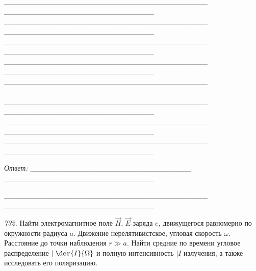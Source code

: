 \begin{enumerate}
    \_\_\_\_\_\_\_\_\_\_\_\_\_\_\_\_\_\_\_\_\_\_\_\_\_\_\_\_\_\_\_\_\_\_\_\_\_\_
    \!\!\_\_\_\_\_\_\_\_\_\_\_\_\_\_\_\_\_\_\_\_\_\_\_\_\_\_\_\_\\
    \_\_\_\_\_\_\_\_\_\_\_\_\_\_\_\_\_\_\_\_\_\_\_\_\_\_\_\_\_\_\_\_\_\_\_\_\_\_
    \!\!\_\_\_\_\_\_\_\_\_\_\_\_\_\_\_\_\_\_\_\_\_\_\_\_\_\_\_\_\\
    \_\_\_\_\_\_\_\_\_\_\_\_\_\_\_\_\_\_\_\_\_\_\_\_\_\_\_\_\_\_\_\_\_\_\_\_\_\_
    \!\!\_\_\_\_\_\_\_\_\_\_\_\_\_\_\_\_\_\_\_\_\_\_\_\_\_\_\_\_\\
    \_\_\_\_\_\_\_\_\_\_\_\_\_\_\_\_\_\_\_\_\_\_\_\_\_\_\_\_\_\_\_\_\_\_\_\_\_\_
    \!\!\_\_\_\_\_\_\_\_\_\_\_\_\_\_\_\_\_\_\_\_\_\_\_\_\_\_\_\_\\
    \_\_\_\_\_\_\_\_\_\_\_\_\_\_\_\_\_\_\_\_\_\_\_\_\_\_\_\_\_\_\_\_\_\_\_\_\_\_
    \!\!\_\_\_\_\_\_\_\_\_\_\_\_\_\_\_\_\_\_\_\_\_\_\_\_\_\_\_\_\\
    \_\_\_\_\_\_\_\_\_\_\_\_\_\_\_\_\_\_\_\_\_\_\_\_\_\_\_\_\_\_\_\_\_\_\_\_\_\_
    \!\!\_\_\_\_\_\_\_\_\_\_\_\_\_\_\_\_\_\_\_\_\_\_\_\_\_\_\_\_\\
    \_\_\_\_\_\_\_\_\_\_\_\_\_\_\_\_\_\_\_\_\_\_\_\_\_\_\_\_\_\_\_\_\_\_\_\_\_\_
    \!\!\_\_\_\_\_\_\_\_\_\_\_\_\_\_\_\_\_\_\_\_\_\_\_\_\_\_\_\_\\
    \_\_\_\_\_\_\_\_\_\_\_\_\_\_\_\_\_\_\_\_\_\_\_\_\_\_\_\_\_\_\_\_\_\_\_\_\_\_
    \!\!\_\_\_\_\_\_\_\_\_\_\_\_\_\_\_\_\_\_\_\_\_\_\_\_\_\_\_\_\\
\end{enumerate}

\vspace*{2em}
\emph{Ответ:}
    \_\_\_\_\_\_\_\_\_\_\_\_\_\_\_\_\_\_\_\_\_\_\_\_\_\_\_\_\_\_
    \!\!\_\_\_\_\_\_\_\_\_\_\_\_\_\_\_\_\_\_\_\_\_\_\_\_\_\_\_\_
      
    \_\_\_\_\_\_\_\_\_\_\_\_\_\_\_\_\_\_\_\_\_\_\_\_\_\_\_\_\_\_\_\_\_\_\_\_\_\_
    \!\!\_\_\_\_\_\_\_\_\_\_\_\_\_\_\_\_\_\_\_\_\_\_\_\_\_\_\_\_\\
    
\newpage

\emph{732.} Найти электромагнитное поле \( \vec{H} \), \( \vec{E} \) заряда
\( e \), движущегося равномерно по окружности радиуса \( a \). Движение
нерелятивистское, угловая скорость \( \omega \). Расстояние до точки наблюдения
\( r \gg a \). Найти средние по времени угловое распределение \( \ds
\mid{\der{I}{\Omega}} \) и полную интенсивность \( \mid{I} \) излучения, а также
исследовать его поляризацию.

